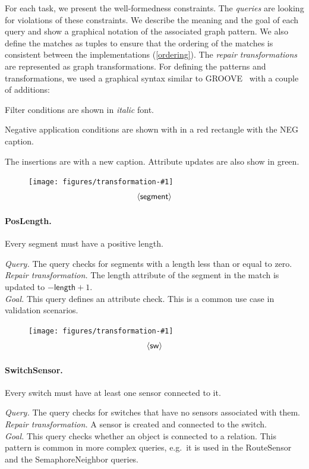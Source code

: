 \documentclass[submission,copyright,creativecommons]{eptcs}
\newcommand{\tuple}[1]{\langle #1 \rangle}
\newcommand{\ttctransformation}[2]{
	\begin{figure}
		\centering
		\vspace{-1em}
		\texttt{[image: figures/transformation-\#1]}
		\vspace{-1em}
		\footnotesize
		\begin{align*}
		\sf #2
		\end{align*}
		\vspace{-3em}
	\end{figure}
}
\begin{document}
For each task, we present the well-formedness constraints. The \emph{queries} are looking for violations of these constraints. We describe the meaning and the goal of each query and show a graphical notation of the associated graph pattern. We also define the matches as tuples to ensure that the ordering of the matches is consistent between the implementations (\autoref{ordering}). The \emph{repair transformations} are represented as graph transformations. For defining the patterns and transformations, we used a graphical syntax similar to GROOVE~\cite{rensink2004groove} with a couple of additions:

\begin{compactitem}
  \item Filter conditions are shown in \textit{italic} font.
  \item Negative application conditions are shown with in a \textcolor{negcolor}{red} rectangle with the \textcolor{negcolor}{\textsf{NEG}} caption.
  \item The insertions are with a \textcolor{newcolor}{\guillemotleft{}new\guillemotright{}} caption. Attribute updates are also show in \textcolor{newcolor}{green}. %
\end{compactitem}

\ttctransformation{poslength}{\tuple{segment}}

\paragraph{PosLength.} Every segment must have a positive length.

\noindent\textit{Query.} The query checks for segments with a length less than or equal to zero. \\
\textit{Repair transformation.} The \textsf{length} attribute of the \textsf{segment} in the match is updated to $- \mathsf{length} + 1$. \\
\textit{Goal.} This query defines an attribute check. This is a common use case in validation scenarios.


\ttctransformation{switchsensor}{\tuple{sw}}
\paragraph{SwitchSensor.} Every switch must have at least one sensor connected to it.

\noindent\textit{Query.} The query checks for switches that have no sensors associated with them. \\
\textit{Repair transformation.} A \textsf{sensor} is created and connected to the \textsf{switch}. \\
\textit{Goal.} This query checks whether an object is connected to a relation. This pattern is common in more complex queries, e.g.\ it is used in the \textsf{RouteSensor} and the \textsf{SemaphoreNeighbor} queries.
\end{document}

